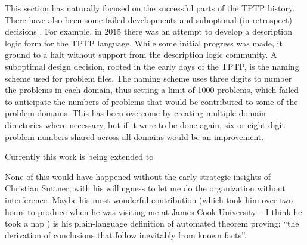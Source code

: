 \documentclass{easychair}
\begin{document}
This section has naturally focused on the successful parts of the TPTP history.
There have also been some failed developments and suboptimal (in retrospect) decisions \frownie{}.
For example, in 2015 there was an attempt to develop a description logic form for the TPTP 
language. 
While some initial progress was made, it ground to a halt without support from the description 
logic community.
A suboptimal design decision, rooted in the early days of the TPTP, is the naming scheme used for 
problem files. 
The naming scheme uses three digits to number the problems in each domain, thus setting a limit 
of 1000 problems, which failed to anticipate the numbers of problems that would be contributed 
to some of the problem domains.
This has been overcome by creating multiple domain directories where necessary, but if it were 
to be done again, six or eight digit problem numbers shared across all domains would be an 
improvement.

Currently this work is being extended to 

None of this would have happened without the early strategic insights of Christian Suttner,
with his willingness to let me do the organization without interference. 
Maybe his most wonderful contribution (which took him over two hours to produce when he
was visiting me at James Cook University -- I think he took a nap \smiley) is his 
plain-language definition of automated theorem proving: 
``the derivation of conclusions that follow inevitably from known facts''.



\end{document}
